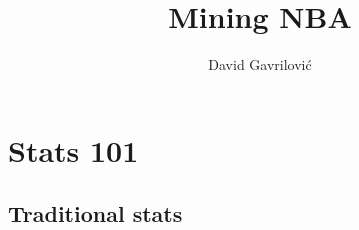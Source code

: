 \documentclass[a4paper]{article}
\begin{document}
\title{Mining NBA}
\author{David Gavrilović}
\maketitle
\thispagestyle{empty}

\newpage

\tableofcontents
\thispagestyle{empty}

\newpage

\section{Stats 101}
\label{Stats_101}

\subsection{Traditional stats}
\label{Traditional_stats}
\end{document}
